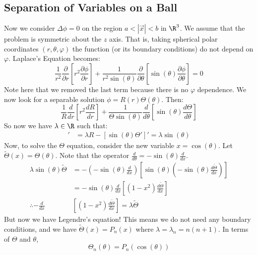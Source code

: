 \documentclass[../Main.tex]{subfiles}
\begin{document}
\subsection{Separation of Variables on a Ball}
Now we consider $\Delta \phi = 0$ on the region $a < |\vec{x}| < b$ in $\R^3$. We assume that the problem is symmetric about the $z$ axis. That is, taking spherical polar coordinates $(r, \theta, \varphi)$ the function (or its boundary conditions) do not depend on $\varphi$. Laplace's Equation becomes:
\begin{equation*}
    \frac{1}{r^2} \frac{\partial }{\partial r}\left[r^2 \frac{\partial \phi}{\partial r}\right] + \frac{1}{r^2 \sin(\theta)} \frac{\partial}{\partial \theta} \left[\sin(\theta) \frac{\partial \phi}{\partial \theta}\right] = 0
\end{equation*}
Note here that we removed the last term because there is no $\varphi$ dependence. We now look for a separable solution $\phi = R(r) \Theta(\theta)$. Then:
\begin{equation*}
    \frac{1}{R} \frac{d}{dr} \left[r^2 \frac{dR}{dr}\right] + \frac{1}{\Theta \sin(\theta)} \frac{d}{d\theta} \left[\sin(\theta) \frac{d\Theta}{d\theta}\right]
\end{equation*}
So now we have $\lambda \in \R$ such that:
\begin{align*}
    [r^2 R']' &= \lambda R
    -[\sin(\theta) \Theta']' = \lambda \sin(\theta)
\end{align*}
Now, to solve the $\Theta$ equation, consider the new variable $x = \cos(\theta)$. Let $\tilde{\Theta}(x) = \Theta(\theta)$. Note that the operator $\frac{d}{d\theta} = -\sin(\theta) \frac{d}{dx}$.
\begin{align*}
    \lambda \sin(\theta) \tilde{\Theta} &= -\left(-\sin(\theta) \frac{d}{dx}\right) \left[\sin(\theta) \left(-\sin(\theta) \frac{d\tilde{\Theta}}{dx}\right)\right] \\
    &= -\sin(\theta) \frac{d}{dx} \left[(1 - x^2) \frac{d\tilde{\Theta}}{dx}\right] \\
    \therefore -\frac{d}{dx} &\left[(1 - x^2) \frac{d\tilde{\Theta}}{dx}\right] = \lambda \tilde{\Theta}
\end{align*}
But now we have Legendre's equation! This means we do not need any boundary conditions, and we have $\tilde{\Theta}(x) = P_n(x)$ where $\lambda = \lambda_n = n(n+1)$. In terms of $\Theta$ and $\theta$,
\begin{equation*}
    \Theta_n(\theta) = P_n(\cos(\theta))
\end{equation*}
\end{document}
